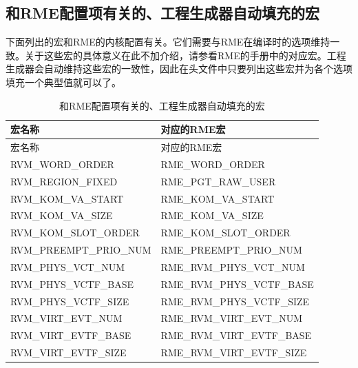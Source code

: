\subsection{和RME配置项有关的、工程生成器自动填充的宏}\label{subsec:8-2-2}

下面列出的宏和RME的内核配置有关。它们需要与RME在编译时的选项维持一致。关于这些宏的具体意义在此不加介绍，请参看RME的手册中的对应宏。工程生成器会自动维持这些宏的一致性，因此在头文件中只要列出这些宏并为各个选项填充一个典型值就可以了。

\begin{xltabular}{\textwidth}{@{}>{\hsize\raggedright\arraybackslash}X>{\hsize\raggedright\arraybackslash}X@{}}
\caption{和RME配置项有关的、工程生成器自动填充的宏}\label{tab:8-3}\\
\toprule
宏名称 & 对应的RME宏\tabularnewline
\endfirsthead
\toprule
宏名称 & 对应的RME宏\tabularnewline
\midrule
\endhead
\bottomrule
\endlastfoot
RVM\_\allowbreak{}WORD\_\allowbreak{}ORDER & RME\_\allowbreak{}WORD\_\allowbreak{}ORDER\tabularnewline
RVM\_\allowbreak{}REGION\_\allowbreak{}FIXED & RME\_\allowbreak{}PGT\_\allowbreak{}RAW\_\allowbreak{}USER\tabularnewline
RVM\_\allowbreak{}KOM\_\allowbreak{}VA\_\allowbreak{}START & RME\_\allowbreak{}KOM\_\allowbreak{}VA\_\allowbreak{}START\tabularnewline
RVM\_\allowbreak{}KOM\_\allowbreak{}VA\_\allowbreak{}SIZE & RME\_\allowbreak{}KOM\_\allowbreak{}VA\_\allowbreak{}SIZE\tabularnewline
RVM\_\allowbreak{}KOM\_\allowbreak{}SLOT\_\allowbreak{}ORDER & RME\_\allowbreak{}KOM\_\allowbreak{}SLOT\_\allowbreak{}ORDER\tabularnewline
RVM\_\allowbreak{}PREEMPT\_\allowbreak{}PRIO\_\allowbreak{}NUM & RME\_\allowbreak{}PREEMPT\_\allowbreak{}PRIO\_\allowbreak{}NUM\tabularnewline
RVM\_\allowbreak{}PHYS\_\allowbreak{}VCT\_\allowbreak{}NUM & RME\_\allowbreak{}RVM\_\allowbreak{}PHYS\_\allowbreak{}VCT\_\allowbreak{}NUM\tabularnewline
RVM\_\allowbreak{}PHYS\_\allowbreak{}VCTF\_\allowbreak{}BASE & RME\_\allowbreak{}RVM\_\allowbreak{}PHYS\_\allowbreak{}VCTF\_\allowbreak{}BASE\tabularnewline
RVM\_\allowbreak{}PHYS\_\allowbreak{}VCTF\_\allowbreak{}SIZE & RME\_\allowbreak{}RVM\_\allowbreak{}PHYS\_\allowbreak{}VCTF\_\allowbreak{}SIZE\tabularnewline
RVM\_\allowbreak{}VIRT\_\allowbreak{}EVT\_\allowbreak{}NUM & RME\_\allowbreak{}RVM\_\allowbreak{}VIRT\_\allowbreak{}EVT\_\allowbreak{}NUM\tabularnewline
RVM\_\allowbreak{}VIRT\_\allowbreak{}EVTF\_\allowbreak{}BASE & RME\_\allowbreak{}RVM\_\allowbreak{}VIRT\_\allowbreak{}EVTF\_\allowbreak{}BASE\tabularnewline
RVM\_\allowbreak{}VIRT\_\allowbreak{}EVTF\_\allowbreak{}SIZE & RME\_\allowbreak{}RVM\_\allowbreak{}VIRT\_\allowbreak{}EVTF\_\allowbreak{}SIZE\tabularnewline

\end{xltabular}

